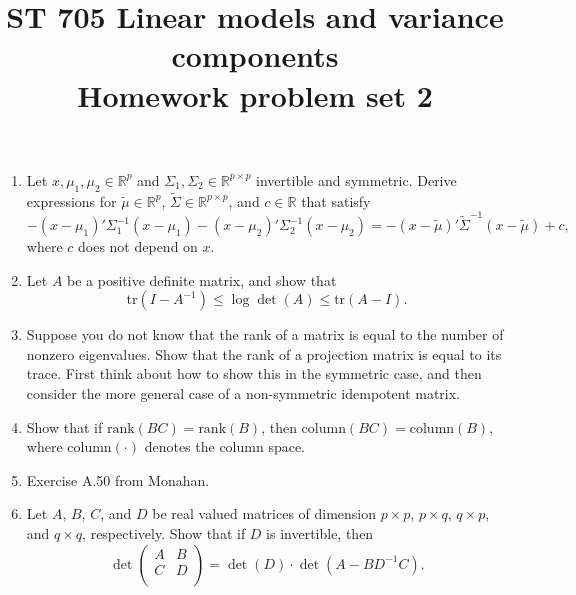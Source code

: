 \documentclass[11pt]{article}
\title{ST 705 Linear models and variance components \\ 
        Homework problem set 2}
\begin{document}
\maketitle

\begin{enumerate}

\item Let $x, \mu_{1}, \mu_{2} \in \mathbb{R}^{p}$ and $\Sigma_{1}, \Sigma_{2} \in \mathbb{R}^{p\times p}$ invertible and symmetric.  Derive expressions for $\widetilde{\mu} \in \mathbb{R}^{p}$, $\widetilde{\Sigma} \in \mathbb{R}^{p\times p}$, and $c \in \mathbb{R}$ that satisfy
\[
-(x - \mu_{1})'\Sigma_{1}^{-1}(x - \mu_{1}) - (x - \mu_{2})'\Sigma_{2}^{-1}(x - \mu_{2}) = -(x - \widetilde{\mu})'\widetilde{\Sigma}^{-1}(x - \widetilde{\mu}) + c,
\]
where $c$ does not depend on $x$.

\item Let $A$ be a positive definite matrix, and show that 
\[
\text{tr}(I - A^{-1}) \le \log\det(A) \le \text{tr}(A - I).
\]

\item Suppose you do not know that the rank of a matrix is equal to the number of nonzero eigenvalues.  Show that the rank of a projection matrix is equal to its trace.  First think about how to show this in the symmetric case, and then consider the more general case of a non-symmetric idempotent matrix.

\item Show that if $\text{rank}(BC) = \text{rank}(B)$, then $\text{column}(BC) = \text{column}(B)$, where column$(\cdot)$ denotes the column space.

\item Exercise A.50 from Monahan.

\item Let $A$, $B$, $C$, and $D$ be real valued matrices of dimension $p\times p$, $p\times q$, $q\times p$, and $q\times q$, respectively.  Show that if $D$ is invertible, then
\[
\det
\begin{pmatrix}
A & B \\
C & D \\
\end{pmatrix} = \det(D) \cdot \det(A - BD^{-1}C).
\]


\end{enumerate}
\end{document}
